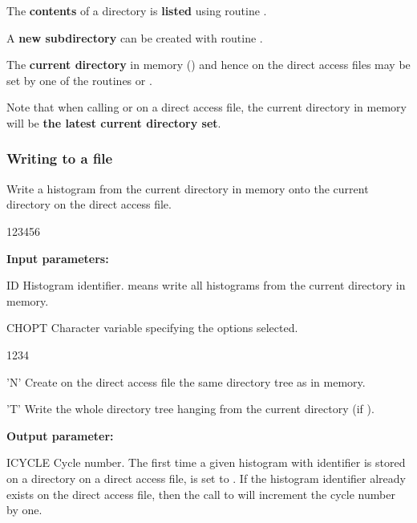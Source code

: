 \begin{UL}
    \item The {\bf contents} of a directory is
        {\bf listed} using routine .
    \item A {\bf new subdirectory} can be created with routine .
    \item The {\bf current directory} in memory ()
        and hence on the direct access files may be set by one of the routines
         or .
\end{UL}

Note that when calling  or  on a 
direct access file, the current directory in memory will be 
{\bf the latest current directory set}.
 
\subsubsection*{Writing to a file}
\label{HWRITFIL} 

 
\Action
Write a  histogram from the current directory in memory
onto the current directory on the direct access file.
 
\begin{DLtt}{123456}
\item[{\rm\bf Input parameters:}]
\item[ID] Histogram identifier.
           means write all histograms from the current directory in
          memory.
\item[CHOPT] Character variable specifying the options selected.
\begin{DLtt}{1234}
\item['N'] Create on the direct access file the same directory tree 
           as in memory.
\item['T'] Write the whole directory tree hanging from the current
           directory (if ).
\end{DLtt}
\item[{\rm\bf Output parameter:}]
\item[ICYCLE]
Cycle number. The first time a given histogram with identifier 
is stored on a directory on a direct access file,
 is set to .
If the histogram identifier  already exists on the direct access
file, then the call to  will increment the cycle number
 by one.
\end{DLtt}
 
